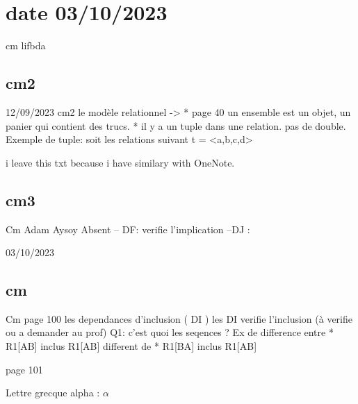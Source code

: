 \documentclass{article}
\begin{document}
\section{date 03/10/2023}

cm lifbda
\subsection{cm2}
12/09/2023 cm2
le modèle relationnel -> 
* page 40 un ensemble est un objet, un panier qui contient des trucs. 
* il y a un tuple dans une relation. pas de double. 
Exemple de tuple: 
soit les relations suivant 
t = <a,b,c,d> 

i leave this txt because i have similary with OneNote.
\subsection{cm3}%
Cm Adam Aysoy Absent
    -- DF: verifie l'implication  
    --DJ : 

03/10/2023 
\subsection{cm}

Cm 
    page 100 
    les dependances d'inclusion ( DI )
    les DI verifie l'inclusion (à verifie ou a demander au prof)
    Q1: c'est quoi les seqences ? Ex de difference entre 
        * R1[AB] inclus R1[AB]
        different de 
        * R1[BA] inclus R1[AB]
    
    page 101 

Lettre grecque alpha : $\alpha$




\end{document}
